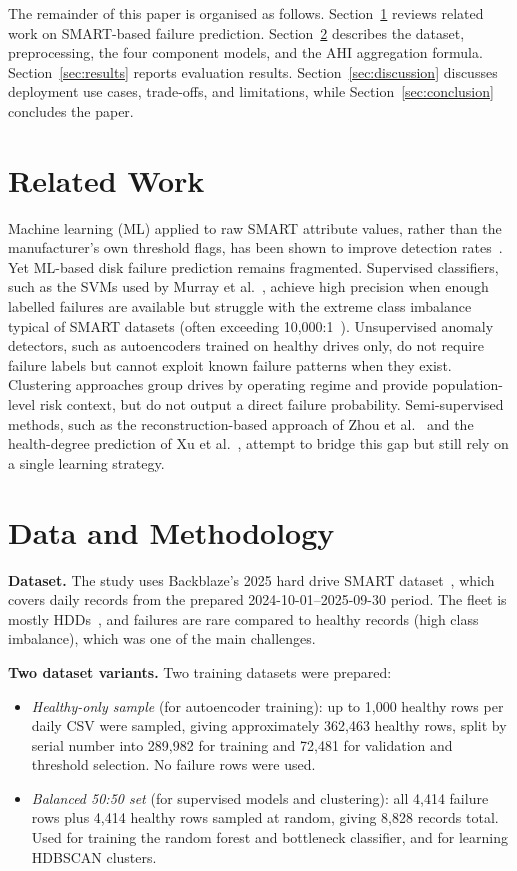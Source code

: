 \documentclass[sigconf,natbib=false]{acmart}
\begin{document}
The remainder of this paper is organised as follows. Section~\ref{sec:related} reviews related work on SMART-based failure prediction. Section~\ref{sec:method} describes the dataset, preprocessing, the four component models, and the AHI aggregation formula. Section~\ref{sec:results} reports evaluation results. Section~\ref{sec:discussion} discusses deployment use cases, trade-offs, and limitations, while Section~\ref{sec:conclusion} concludes the paper.

\section{Related Work}
\label{sec:related}

Machine learning (ML) applied to raw SMART attribute values, rather than the manufacturer's own threshold flags, has been shown to improve detection rates~\cite{murray2005,lu2020smarter}. Yet ML-based disk failure prediction remains fragmented. Supervised classifiers, such as the SVMs used by Murray et al.~\cite{murray2005}, achieve high precision when enough labelled failures are available but struggle with the extreme class imbalance typical of SMART datasets (often exceeding 10{,}000:1~\cite{ahmed2024costaware}). Unsupervised anomaly detectors, such as autoencoders trained on healthy drives only, do not require failure labels but cannot exploit known failure patterns when they exist. Clustering approaches group drives by operating regime and provide population-level risk context, but do not output a direct failure probability. Semi-supervised methods, such as the reconstruction-based approach of Zhou et al.~\cite{zhou2024proactive} and the health-degree prediction of Xu et al.~\cite{xu2018layerwise}, attempt to bridge this gap but still rely on a single learning strategy.

\section{Data and Methodology}
\label{sec:method}

\textbf{Dataset.} The study uses Backblaze's 2025 hard drive SMART dataset~\cite{backblaze2025}, which covers daily records from the prepared 2024-10-01--2025-09-30 period. The fleet is mostly HDDs~\cite{backblaze2025stats}, and failures are rare compared to healthy records (high class imbalance), which was one of the main challenges.

\textbf{Two dataset variants.} Two training datasets were prepared:
\begin{itemize}
    \item \emph{Healthy-only sample} (for autoencoder training): up to 1{,}000 healthy rows per daily CSV were sampled, giving approximately 362{,}463 healthy rows, split by serial number into 289{,}982 for training and 72{,}481 for validation and threshold selection. No failure rows were used.
    \item \emph{Balanced 50:50 set} (for supervised models and clustering): all 4{,}414 failure rows plus 4{,}414 healthy rows sampled at random, giving 8{,}828 records total. Used for training the random forest and bottleneck classifier, and for learning HDBSCAN clusters.
\end{itemize}
\end{document}
